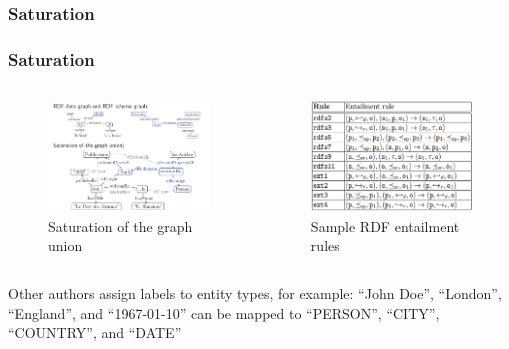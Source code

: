 \documentclass{beamer}
\numberwithin{figure}{section}
\numberwithin{equation}{section}
\begin{document}
\subsubsection{Saturation }
\begin{frame} \scriptsize \justifying
 \frametitle{Saturation}
 \begin{columns}[c] 
 		\begin{figure}[p]
  		\centering
  		\includegraphics[width=1.0\linewidth]{pictures/RDF_RDFS_Saturacion}
  		\caption{\tiny Saturation of the graph union}
  		\label{fig:approaches_RDF}
 	\end{figure}
 		\begin{figure}[p]
  		\centering
  		\includegraphics[width=1.0\linewidth]{pictures/Rule_RDFS}
  		\caption{\tiny Sample RDF entailment rules\cite{Hassad2017a}}
  		\label{fig:approaches_RDF}
 	\end{figure}
 \end{columns}
 
 
 \vspace{3mm}
 \textcolor{rojo}{Other authors}\cite{Trisedya2018}\cite{Schlichtkrull2017}  assign labels to entity types, for example: “John Doe”, “London”, “England”, and “1967-01-10” can be mapped to “PERSON”, “CITY”, “COUNTRY”, and “DATE” 
 
\end{frame}
\end{document}
